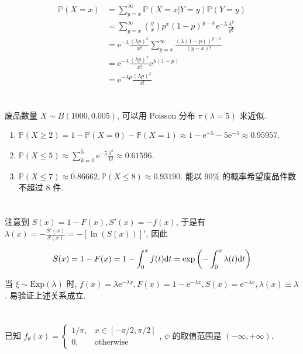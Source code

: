 \documentclass[8pt]{article}
\theoremstyle{compact}
\def\le{\leqslant}
\def\ge{\geqslant}
\def\P#1{\mathbb{P}\left({#1}\right)}
\def\e{\mathrm{e}}
\begin{document}
\begin{equation}
	\begin{split}
		\P{X = x} &= \sum_{y = x}^{\infty} \P{X = x | Y = y} \P{Y = y}\\
		&= \sum_{y = x}^{\infty} \binom{y}{x}p^x(1-p)^{y-x}\e^{-\lambda}\frac{\lambda^y}{y!}\\
		&= \e^{-\lambda}\frac{(\lambda p)^x}{x!} \sum_{y=x}^{\infty} \frac{(\lambda(1-p))^{y-x}}{(y-x)!}\\
		&= \e^{-\lambda}\frac{(\lambda p)^x}{x!} \e^{\lambda(1-p)}\\
		&= \e^{-\lambda p}\frac{(\lambda p)^x}{x!}
	\end{split}
\end{equation}

\section{}
废品数量 $X \sim B(1000, 0.005)$, 可以用 Poisson 分布 $\pi(\lambda = 5)$ 来近似.
\begin{enumerate}
	\item $\P{X \ge 2} = 1 - \P{X = 0} - \P{X = 1} \approx 1 - \e^{-5} - 5\e^{-5} \approx 0.95957$.
	\item $\P{X \le 5} \approx \sum_{k=0}^{5}\e^{-5}\frac{5^k}{k!} \approx 0.61596$.
	\item $\P{X \le 7} \approx 0.86662, \P{X \le 8} \approx 0.93190$. 能以 $90\%$ 的概率希望废品件数不超过 $8$ 件.
\end{enumerate}

\section{}

注意到 $S(x) = 1 - F(x), S'(x) = -f(x)$, 于是有 $\lambda(x) = -\frac{S'(x)}{S(x)} = -\left[\ln(S(x))\right]'$, 因此

$$S(x) = 1 - F(x) = 1 - \int_{0}^{x}f(t)\text dt = \exp\left(-\int_0^x \lambda(t)\text dt\right)$$

当 $\xi \sim \textrm{Exp}(\lambda)$ 时, $f(x) = \lambda \e^{-\lambda x}, F(x) = 1 - \e^{-\lambda x}, S(x) = \e^{-\lambda x}, \lambda(x) \equiv \lambda$. 易验证上述关系成立.

\section{}

已知 $f_{\theta}(x) = \begin{cases}
	1 / \pi, & x \in [-\pi / 2, \pi / 2] \\
	0, & \textrm{otherwise}
\end{cases}$, $\psi$ 的取值范围是 $(-\infty, +\infty)$.
\end{document}
